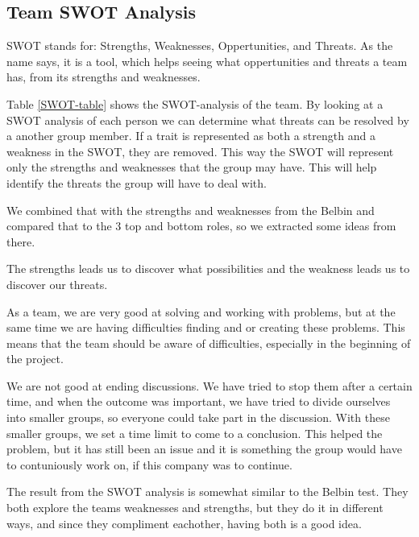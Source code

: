 \subsection{Team SWOT Analysis} 
SWOT stands for: Strengths, Weaknesses, Oppertunities, and Threats. As the name says, it is a tool, which helps seeing what oppertunities and threats a team has, from its strengths and weaknesses. 
 
Table \ref{SWOT-table} shows the SWOT-analysis of the team. 
By looking at a SWOT analysis of each person we can determine what threats can be resolved by a another group member.
If a trait is represented as both a strength and a weakness in the SWOT, they are removed. This way the SWOT will represent only the strengths and weaknesses that the group may have. This will help identify the threats the group will have to deal with.

We combined that with the strengths and weaknesses from the Belbin and compared that to the 3 top and bottom roles, so we extracted some ideas from there.

The strengths leads us to discover what possibilities and the weakness leads us to discover our threats. 

As a team, we are very good at solving and working with problems, but at the same time we are having difficulties finding and or creating these problems. 
This means that the team should be aware of difficulties, especially in the beginning of the project.


We are not good at ending discussions. We have tried to stop them after a certain time, and when the outcome was important, we have tried to divide ourselves into smaller groups, so everyone could take part in the discussion. With these smaller groups, we set a time limit to come to a conclusion. This helped the problem, but it has still been an issue and it is something the group would have to contuniously work on, if this company was to continue. 


The result from the SWOT analysis is somewhat similar to the Belbin test. They both explore the teams weaknesses and strengths, but they do it in different ways, and since they compliment eachother, having both is a good idea.

